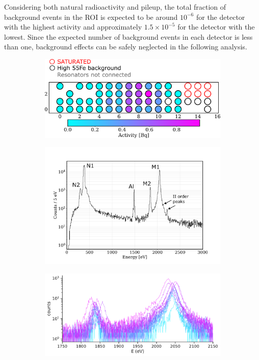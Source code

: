 Considering both natural radioactivity and pileup, the total fraction of background events in the ROI is expected to
be around $10^{-6}$ for the detector with the highest activity and approximately $1.5 \times 10^{-5}$ for the detector
with the lowest. Since the expected number of background events in each detector is less than one, background effects
can be safely neglected in the following analysis.

\begin{figure}[t]
\begin{subfigure}[b]{0.45\linewidth}
  \hfill
  \includegraphics[width=\linewidth]{figures/ch3/activity_tesA.pdf}
  \hfill
  \caption{}
\end{subfigure}
\begin{subfigure}[b]{0.55\linewidth}
  \includegraphics[width=\linewidth]{figures/ch3/Ho_combined.pdf}
  \caption{}
\end{subfigure}
\begin{minipage}{\textwidth}
\begin{subfigure}[b]{\linewidth}
  \includegraphics[width=\linewidth]{figures/ch3/peaks/M1M2_0.pdf}

\end{subfigure}
\end{minipage}
\end{figure}
